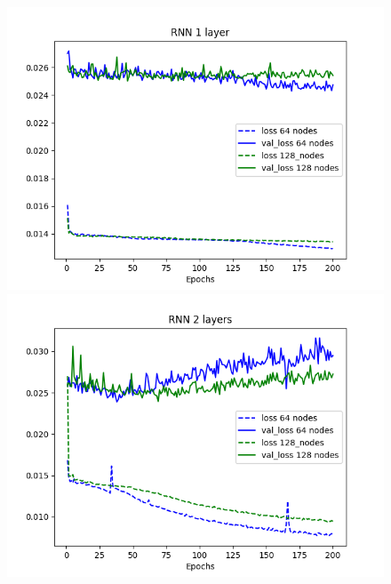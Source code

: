 \documentclass[11pt]
{article}
\begin{document}
\begin{figure}[ht]
\begin{minipage}[b]{0.33\linewidth}
		\includegraphics[width=\linewidth]{../TESTS_RESULTS/RNN_tests/plots/1_comp.png} 
	\end{minipage}%
	\begin{minipage}[b]{0.33\linewidth}
		\centering
		\includegraphics[width=\linewidth]{../TESTS_RESULTS/RNN_tests/plots/2_comp.png} 
	\end{minipage} 
	\begin{minipage}[b]{0.33\linewidth}
		\centering

\end{minipage}
\end{figure}
\end{document}
